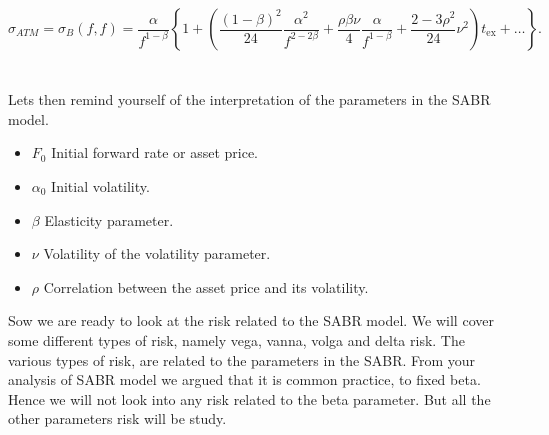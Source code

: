 \begin{equation}
    \sigma_{ATM} = \sigma_B(f, f) = \frac{\alpha}{f^{1-\beta}} \left\{ 1 + \left( \frac{(1-\beta)^2}{24} \frac{\alpha^2}{f^{2-2\beta}} + \frac{\rho \beta \nu}{4} \frac{\alpha}{f^{1-\beta}} + \frac{2-3\rho^2}{24} \nu^2 \right) t_{\text{ex}} + \ldots \right\}.
    \label{sigma_ff}
\end{equation}
\\\\
Lets then remind yourself of the interpretation of the parameters in the SABR model. 
\begin{itemize}
    \item $F_0$ \text{---} Initial forward rate or asset price.
    \item $\alpha_0$ \text{---} Initial volatility.
    \item $\beta$ \text{---} Elasticity parameter.
    \item $\nu$ \text{---} Volatility of the volatility parameter.
    \item $\rho$ \text{---} Correlation between the asset price and its volatility.
\end{itemize}
\noindent
Sow we are ready to look at the risk related to the SABR model.
We will cover some different types of risk, namely vega, vanna, volga and delta risk. 
The various types of risk, are related to the parameters in the SABR. 
From your analysis of SABR model we argued that it is common practice, 
to fixed beta. Hence we will not look into any risk related to the beta parameter. 
But all the other parameters risk will be study. 